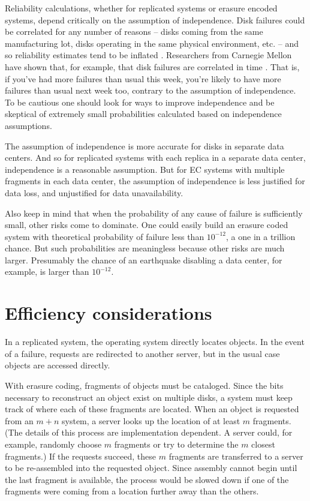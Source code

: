 \documentclass[11pt]{article}
\begin{document}
Reliability calculations, whether for replicated systems or erasure encoded systems, depend critically on the assumption of independence. Disk failures could be correlated for any number of reasons -- disks coming from the same manufacturing lot, disks operating in the same physical environment, etc. -- and so reliability estimates tend to be inflated \cite{goog}. Researchers from Carnegie Mellon have shown that, for example, that disk failures are correlated in time \cite{cmu}. That is, if you've had more failures than usual this week, you're likely to have more failures than usual next week too, contrary to the assumption of independence. To be cautious one should look for ways to improve independence and be skeptical of extremely small probabilities calculated based on independence assumptions. 

The assumption of independence is more accurate for disks in separate data centers. And so for replicated systems with each replica in a separate data center, independence is a reasonable assumption. But for EC systems with multiple fragments in each data center, the assumption of independence is less justified for data loss, and unjustified for data unavailability.

Also keep in mind that when the probability of any cause of failure is sufficiently small, other risks come to dominate. One could easily build an erasure coded system with theoretical probability of failure less than $10^{-12}$, a one in a trillion chance. But such probabilities are meaningless because other risks are much larger. Presumably the chance of an earthquake disabling a data center, for example, is larger than $10^{-12}$.

\section{Efficiency considerations}

In a replicated system, the operating system directly locates objects. In the event of a failure, requests are redirected to another server, but in the usual case objects are accessed directly. 

With erasure coding, fragments of objects must be cataloged. Since the bits necessary to reconstruct an object exist on multiple disks, a system must keep track of where each of these fragments are located. When an object is requested from an $m+n$ system, a server looks up the location of at least $m$ fragments. (The details of this process are implementation dependent. A server could, for example, randomly choose $m$ fragments or try to determine the $m$ closest fragments.) If the requests succeed, these $m$ fragments are transferred to a server to be re-assembled into the requested object. Since assembly cannot begin until the last fragment is available, the process would be slowed down if one of the fragments were coming from a location further away than the others.
\end{document}
